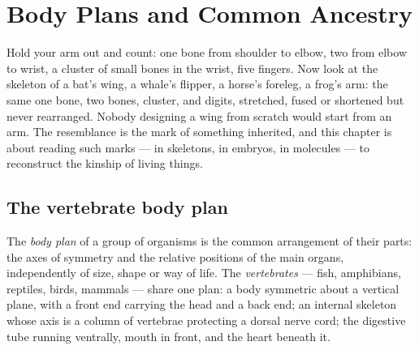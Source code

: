 \chapter{Body Plans and Common Ancestry}\label{ch:g10:common-ancestry}

Hold your arm out and count: one bone from shoulder to elbow, two from
elbow to wrist, a cluster of small bones in the wrist, five fingers. Now
look at the skeleton of a bat's wing, a whale's flipper, a horse's
foreleg, a frog's arm: the same one bone, two bones, cluster, and
digits, stretched, fused or shortened but never rearranged. Nobody
designing a wing from scratch would start from an arm. The resemblance
is the mark of something inherited, and this chapter is about reading
such marks --- in skeletons, in embryos, in molecules --- to reconstruct
the kinship of living things.

\section{The vertebrate body plan}

\begin{definition}\label{def:g10:common-ancestry:bodyplan}
The \emph{body plan} of a group of organisms is the
common arrangement of their parts: the axes of symmetry and the
relative positions of the main organs, independently of size, shape
or way of life. The \emph{vertebrates} --- fish,
amphibians, reptiles, birds, mammals --- share one plan: a body
symmetric about a vertical plane, with a front end carrying the head
and a back end; an internal skeleton whose axis is a column of
vertebrae protecting a dorsal nerve cord; the digestive tube running
ventrally, mouth in front, and the heart beneath it.
\end{definition}

